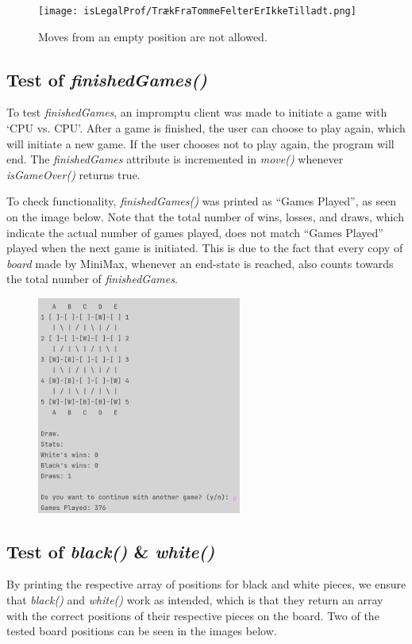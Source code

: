 \documentclass[12pt, a4paper]{article}
\begin{document}
\begin{figure}[h]
	\centering
	\caption*{Moves from an empty position are not allowed.}
	\texttt{[image: isLegalProf/TrækFraTommeFelterErIkkeTilladt.png]}	
\end{figure}
\clearpage
\subsection{Test of \emph{finishedGames()}} \par
To test \emph{finishedGames}, an impromptu client was made to initiate a game with ‘CPU vs. CPU’. After a game is finished, the user can choose to play again, which will initiate a new game. If the user chooses not to play again, the program will end. The \emph{finishedGames} attribute is incremented in \emph{move()} whenever \emph{isGameOver()} returns true. \par To check functionality, \emph{finishedGames()} was printed as “Games Played”, as seen on the image below. 
Note that the total number of wins, losses, and draws, which indicate the actual number of games played, does not match “Games Played” played when the next game is initiated. This is due to the fact that every copy of \emph{board} made by MiniMax, whenever an end-state is reached, also counts towards the total number of \emph{finishedGames}.

\begin{figure}[h]
	\centering
	\includegraphics[width=0.6\textwidth]{TestAfFinishedGames.png}	
\end{figure}

\subsection{Test of \emph{black()} \& \emph{white()}}
By printing the respective array of positions for black and white pieces, we ensure that \emph{black()} and \emph{white()} work as intended, which is that they return an array with the correct positions of their respective pieces on the board. Two of the tested board positions can be seen in the images below.
\end{document}
